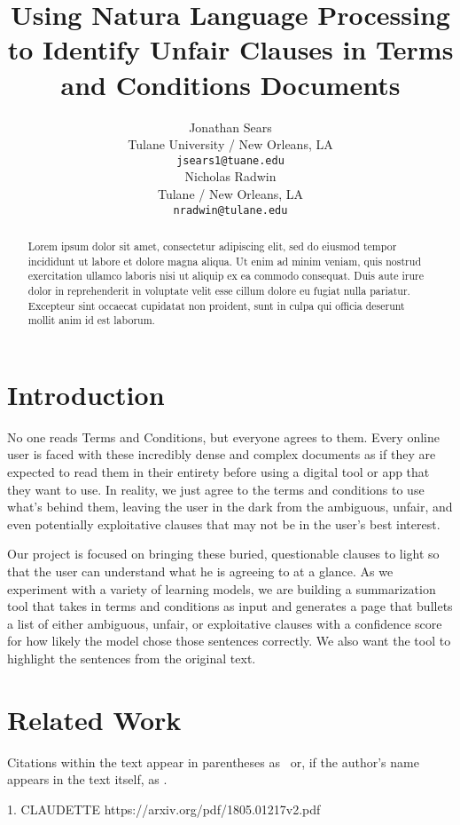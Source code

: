 \documentclass[11pt,a4paper]{article}
\title{Using Natura Language Processing to Identify Unfair Clauses in Terms and Conditions Documents}
\author{Jonathan Sears\\
  Tulane University / New Orleans, LA \\
  \texttt{jsears1@tuane.edu} \\\And
  Nicholas Radwin \\
  Tulane  / New Orleans, LA\\
  \texttt{nradwin@tulane.edu} \\}
\date{}
\begin{document}
\maketitle
\begin{abstract}
Lorem ipsum dolor sit amet, consectetur adipiscing elit, sed do eiusmod tempor incididunt ut labore et dolore magna aliqua. Ut enim ad minim veniam, quis nostrud exercitation ullamco laboris nisi ut aliquip ex ea commodo consequat. Duis aute irure dolor in reprehenderit in voluptate velit esse cillum dolore eu fugiat nulla pariatur. Excepteur sint occaecat cupidatat non proident, sunt in culpa qui officia deserunt mollit anim id est laborum.
\end{abstract}


\section{Introduction}

No one reads Terms and Conditions, but everyone agrees to them. Every online user is faced with these incredibly dense and complex documents as if they are expected to read them in their entirety before using a digital tool or app that they want to use. In reality, we just agree to the terms and conditions to use what's behind them, leaving the user in the dark from the ambiguous, unfair, and even potentially exploitative clauses that may not be in the user's best interest.

Our project is focused on bringing these buried, questionable clauses to light so that the user can understand what he is agreeing to at a glance. As we experiment with a variety of learning models, we are building a summarization tool that takes in terms and conditions as input and generates a page that bullets a list of either ambiguous, unfair, or exploitative clauses with a confidence score for how likely the model chose those sentences correctly. We also want the tool to highlight the sentences from the original text.

\section{Related Work}

Citations within the text appear in parentheses as~\citep{aho1972theory} or, if the author's name appears in the text itself, as \citet{andrew2007scalable}.

1. CLAUDETTE
https://arxiv.org/pdf/1805.01217v2.pdf
\end{document}
